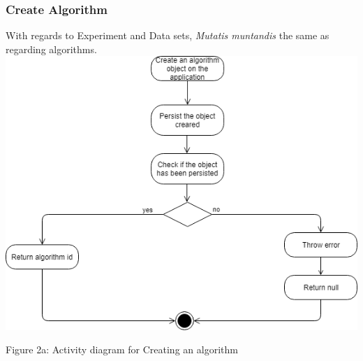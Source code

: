 	\subsubsection{Create Algorithm}
    \par With regards to Experiment and Data sets,
{ \textit{Mutatis muntandis} the same as regarding algorithms.} \newline \newline
    \includegraphics[width=\textwidth]{input_unit/images/create_algorithm_activity_diagram.png}
	\begin{center}
	    \small{Figure 2a: Activity diagram for Creating an algorithm }
    \end{center}
    
